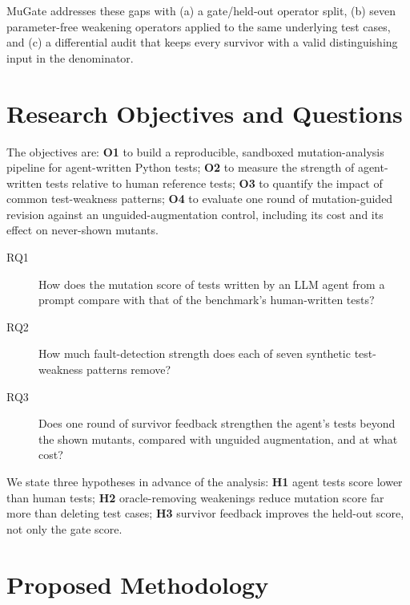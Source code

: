 \documentclass[runningheads]{llncs}
\begin{document}
MuGate addresses these gaps with (a) a gate/held-out operator split, (b) seven parameter-free weakening operators applied to the same underlying test cases, and (c) a differential audit that keeps every survivor with a valid distinguishing input in the denominator.

\section{Research Objectives and Questions}\label{sec:rq}

The objectives are: \textbf{O1} to build a reproducible, sandboxed mutation-analysis pipeline for agent-written Python tests; \textbf{O2} to measure the strength of agent-written tests relative to human reference tests; \textbf{O3} to quantify the impact of common test-weakness patterns; \textbf{O4} to evaluate one round of mutation-guided revision against an unguided-augmentation control, including its cost and its effect on never-shown mutants.

\begin{description}
\item[RQ1] How does the mutation score of tests written by an LLM agent from a prompt compare with that of the benchmark's human-written tests?
\item[RQ2] How much fault-detection strength does each of seven synthetic test-weakness patterns remove?
\item[RQ3] Does one round of survivor feedback strengthen the agent's tests beyond the shown mutants, compared with unguided augmentation, and at what cost?
\end{description}

We state three hypotheses in advance of the analysis: \textbf{H1} agent tests score lower than human tests; \textbf{H2} oracle-removing weakenings reduce mutation score far more than deleting test cases; \textbf{H3} survivor feedback improves the held-out score, not only the gate score.

\section{Proposed Methodology}\label{sec:method}
\end{document}
